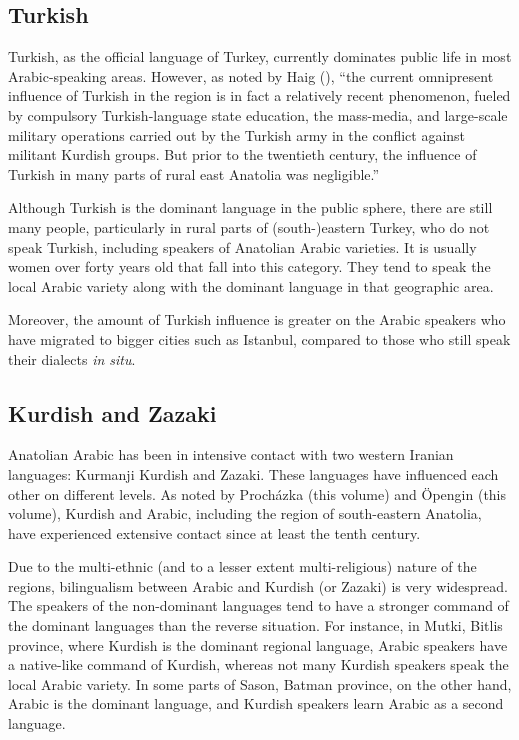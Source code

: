 \documentclass[output=paper]{langsci/langscibook}
\begin{document}
\subsection{Turkish}
Turkish, as the official language of Turkey, currently dominates public life in most Arabic-speaking areas. However, as noted by Haig (\citeyear[14]{Haig2014}), ``the current omnipresent influence of Turkish in the region is in fact a relatively recent phenomenon,
fueled by compulsory Turkish-language state education, the mass-media, and large-scale military operations carried out by the Turkish army in the conflict against militant Kurdish groups. But prior to the twentieth century, the influence of Turkish in many parts of rural east Anatolia was negligible.''

Although Turkish is the dominant language in the public sphere, there are still many people, particularly in rural parts of (south-)eastern Turkey, who do not speak Turkish, including speakers of Anatolian Arabic varieties. It is usually women over forty years old that fall into this category. They tend to speak the local Arabic variety along with the dominant language in that geographic area. 

Moreover, the amount of Turkish influence is greater on the Arabic speakers who have migrated to bigger cities such as Istanbul, compared to those who still speak their dialects \textit{in situ}.

\subsection{Kurdish and Zazaki}
Anatolian Arabic has been in intensive contact with two western Iranian languages: Kurmanji Kurdish and Zazaki. These languages have influenced each other on different levels. As noted by Proch\'{a}zka (this volume) and Öpengin (this volume), Kurdish and Arabic, including the region of south-eastern Anatolia, have experienced extensive contact since at least the tenth century.


Due to the multi-ethnic (and to a lesser extent multi-religious) nature of the regions, bilingualism between Arabic and Kurdish (or Zazaki) is very widespread. The speakers of the non-dominant languages tend to have a stronger command of the dominant languages than the reverse situation. For instance, in Mutki, Bitlis province, where Kurdish is the dominant regional language, Arabic speakers have a native-like command of Kurdish, whereas not many Kurdish speakers speak the local Arabic variety. In some parts of Sason, Batman province, on the other hand, Arabic is the dominant language, and Kurdish speakers learn Arabic as a second language. 
\end{document}
